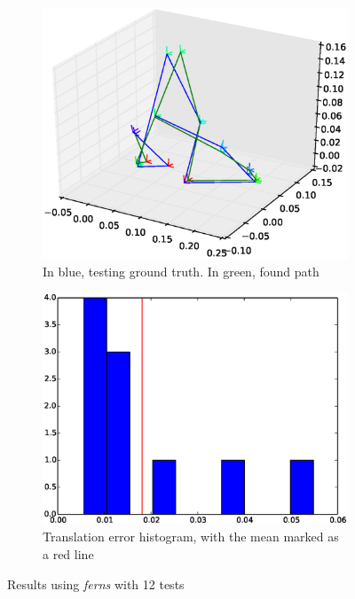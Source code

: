 \begin{figure}[htpb]
  \begin{subfigure}[b]{6cm}
          \includegraphics[width=\linewidth]{img/desktop_2_ferns_60_12_path_1.eps}
          \caption{In blue, testing ground truth. In green, found path}                
          \label{fig:desktop_2_ferns_path_1}
  \end{subfigure}   
  \qquad
  \begin{subfigure}[b]{6cm}
          \includegraphics[width=\linewidth]{img/desktop_2_ferns_60_12_dist_1.eps}
          \caption{Translation error histogram, with the mean marked as a red line}                
          \label{fig:desktop_2_ferns_dist_1}
  \end{subfigure}
  \caption{Results using \textit{ferns} with 12 tests}
\end{figure}


